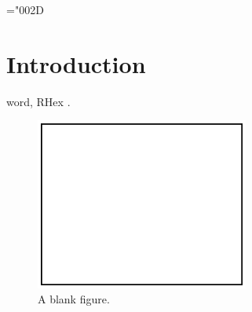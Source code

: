 \mathchardef\minus="002D

\section{Introduction}
\label{sec:introduction}

 word, RHex  \cite{paper:saranli-ijrr-2001}.

\begin{figure}
  \centering
  \includegraphics[width=7cm]{figures/blankfig.eps}
  \caption{A blank figure.}
  \label{fig:blank}
\end{figure}


